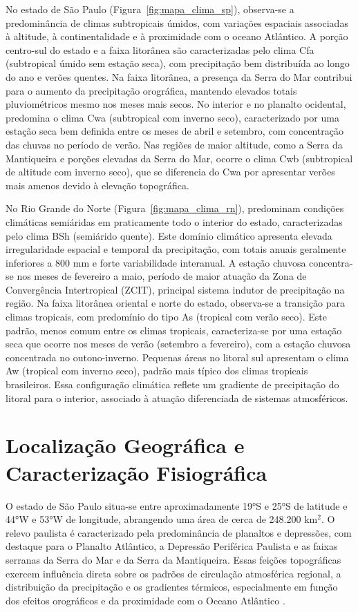 No estado de São Paulo (Figura~\ref{fig:mapa_clima_sp}), observa-se a predominância de climas subtropicais úmidos, com variações espaciais associadas à altitude, à continentalidade e à proximidade com o oceano Atlântico. A porção centro-sul do estado e a faixa litorânea são caracterizadas pelo clima Cfa (subtropical úmido sem estação seca), com precipitação bem distribuída ao longo do ano e verões quentes. Na faixa litorânea, a presença da Serra do Mar contribui para o aumento da precipitação orográfica, mantendo elevados totais pluviométricos mesmo nos meses mais secos. No interior e no planalto ocidental, predomina o clima Cwa (subtropical com inverno seco), caracterizado por uma estação seca bem definida entre os meses de abril e setembro, com concentração das chuvas no período de verão. Nas regiões de maior altitude, como a Serra da Mantiqueira e porções elevadas da Serra do Mar, ocorre o clima Cwb (subtropical de altitude com inverno seco), que se diferencia do Cwa por apresentar verões mais amenos devido à elevação topográfica.

No Rio Grande do Norte (Figura~\ref{fig:mapa_clima_rn}), predominam condições climáticas semiáridas em praticamente todo o interior do estado, caracterizadas pelo clima BSh (semiárido quente). Este domínio climático apresenta elevada irregularidade espacial e temporal da precipitação, com totais anuais geralmente inferiores a 800 mm e forte variabilidade interanual. A estação chuvosa concentra-se nos meses de fevereiro a maio, período de maior atuação da Zona de Convergência Intertropical (ZCIT), principal sistema indutor de precipitação na região. Na faixa litorânea oriental e norte do estado, observa-se a transição para climas tropicais, com predomínio do tipo As (tropical com verão seco). Este padrão, menos comum entre os climas tropicais, caracteriza-se por uma estação seca que ocorre nos meses de verão (setembro a fevereiro), com a estação chuvosa concentrada no outono-inverno. Pequenas áreas no litoral sul apresentam o clima Aw (tropical com inverno seco), padrão mais típico dos climas tropicais brasileiros. Essa configuração climática reflete um gradiente de precipitação do litoral para o interior, associado à atuação diferenciada de sistemas atmosféricos.
\newpage
\section{Localização Geográfica e Caracterização Fisiográfica}

O estado de São Paulo situa-se entre aproximadamente 19°S e 25°S de latitude e 44°W e 53°W de longitude, abrangendo uma área de cerca de 248.200 km$^2$. O relevo paulista é caracterizado pela predominância de planaltos e depressões, com destaque para o Planalto Atlântico, a Depressão Periférica Paulista e as faixas serranas da Serra do Mar e da Serra da Mantiqueira. Essas feições topográficas exercem influência direta sobre os padrões de circulação atmosférica regional, a distribuição da precipitação e os gradientes térmicos, especialmente em função dos efeitos orográficos e da proximidade com o Oceano Atlântico \citep{ibge_biomas_pagina}.

